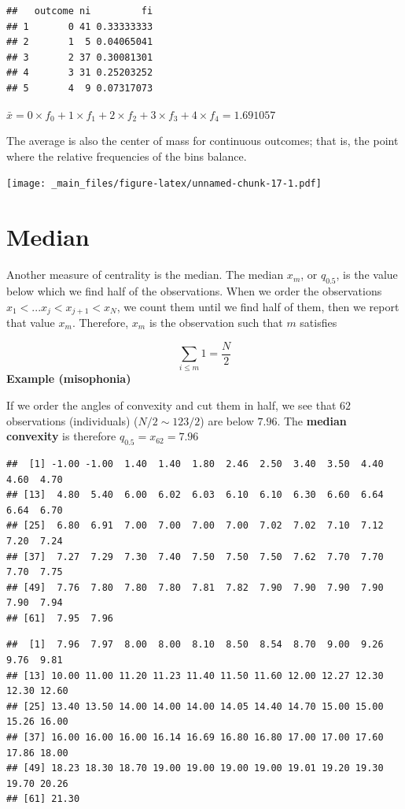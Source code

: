 \documentclass[
]{book}
\begin{document}
\begin{verbatim}
##   outcome ni         fi
## 1       0 41 0.33333333
## 2       1  5 0.04065041
## 3       2 37 0.30081301
## 4       3 31 0.25203252
## 5       4  9 0.07317073
\end{verbatim}

\(\bar{x}=0\times f_ {0}+ 1\times f_{1}+2 \times f_{2}+3 \times f_{3}+4 \times f_{4}=1.691057\)

The average is also the center of mass for continuous outcomes; that is, the point where the relative frequencies of the bins balance.

\texttt{[image: \_main\_files/figure-latex/unnamed-chunk-17-1.pdf]}

\hypertarget{median}{%
\section{Median}\label{median}}

Another measure of centrality is the median. The median \(x_m\), or \(q_{0.5}\), is the value below which we find half of the observations. When we order the observations \(x_1 <... x_j < x_{j+1} < x_N\), we count them until we find half of them, then we report that value \(x_m\). Therefore, \(x_m\) is the observation such that \(m\) satisfies

\[\sum_{i\leq m} 1 = \frac{N}{2}\]
\textbf{Example (misophonia)}

If we order the angles of convexity and cut them in half, we see that \(62\) observations (individuals) (\(N/2 \sim 123/2\)) are below \(7.96\). The \textbf{median convexity} is therefore \(q_{0.5}= x_{62}=7.96\)

\begin{verbatim}
##  [1] -1.00 -1.00  1.40  1.40  1.80  2.46  2.50  3.40  3.50  4.40  4.60  4.70
## [13]  4.80  5.40  6.00  6.02  6.03  6.10  6.10  6.30  6.60  6.64  6.64  6.70
## [25]  6.80  6.91  7.00  7.00  7.00  7.00  7.02  7.02  7.10  7.12  7.20  7.24
## [37]  7.27  7.29  7.30  7.40  7.50  7.50  7.50  7.62  7.70  7.70  7.70  7.75
## [49]  7.76  7.80  7.80  7.80  7.81  7.82  7.90  7.90  7.90  7.90  7.90  7.94
## [61]  7.95  7.96
\end{verbatim}

\begin{verbatim}
##  [1]  7.96  7.97  8.00  8.00  8.10  8.50  8.54  8.70  9.00  9.26  9.76  9.81
## [13] 10.00 11.00 11.20 11.23 11.40 11.50 11.60 12.00 12.27 12.30 12.30 12.60
## [25] 13.40 13.50 14.00 14.00 14.00 14.05 14.40 14.70 15.00 15.00 15.26 16.00
## [37] 16.00 16.00 16.00 16.14 16.69 16.80 16.80 17.00 17.00 17.60 17.86 18.00
## [49] 18.23 18.30 18.70 19.00 19.00 19.00 19.00 19.01 19.20 19.30 19.70 20.26
## [61] 21.30
\end{verbatim}
\end{document}

